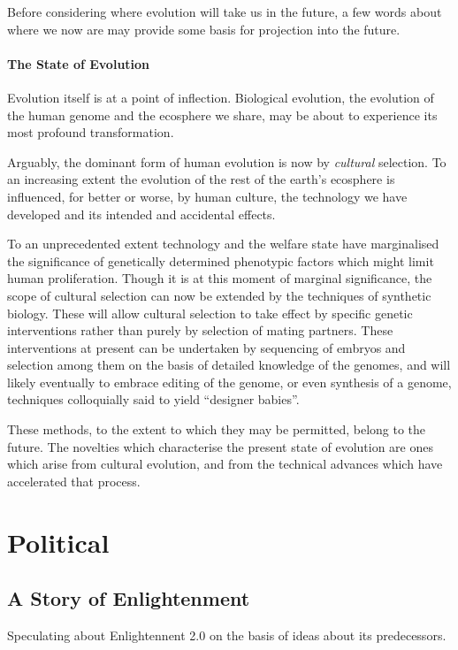\documentclass[10pt,titlepage]{book}
\begin{document}
Before considering where evolution will take us in the future, a few words about where we now are may provide some basis for projection into the future.

\subsection{The State of Evolution}

Evolution itself is at a point of inflection.
Biological evolution, the evolution of the human genome and the ecosphere we share, may be about to experience its most profound transformation.

Arguably, the dominant form of human evolution is now by \emph{cultural} selection.
To an increasing extent the evolution of the rest of the earth's ecosphere is influenced, for better or worse, by human culture, the technology we have developed and its intended and accidental effects.

To an unprecedented extent technology and the welfare state have marginalised the significance of genetically determined phenotypic factors which might limit human proliferation.
Though it is at this moment of marginal significance, the scope of cultural selection can now be extended by the techniques of synthetic biology.
These will allow cultural selection to take effect by specific genetic interventions rather than purely by selection of mating partners.
These interventions at present can be undertaken by sequencing of embryos and selection among them on the basis of detailed knowledge of the genomes, and will likely eventually to embrace editing of the genome, or even synthesis of a genome, techniques colloquially said to yield ``designer babies''.

These methods, to the extent to which they may be permitted,  belong to the future.
The novelties which characterise the present state of evolution are ones which arise from cultural evolution, and from the technical advances which have accelerated that process.


\part{Political}

\chapter{A Story of Enlightenment}

Speculating about Enlightennent 2.0 on the basis of ideas about its predecessors.
\end{document}
